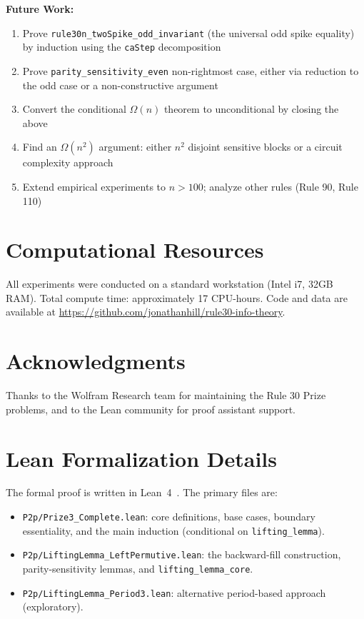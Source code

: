 \documentclass[11pt]{article}
\begin{document}
\textbf{Future Work:}
\begin{enumerate}
    \item Prove \texttt{rule30n\_twoSpike\_odd\_invariant} (the universal odd spike equality) by induction using the \texttt{caStep} decomposition
    \item Prove \texttt{parity\_sensitivity\_even} non-rightmost case, either via reduction to the odd case or a non-constructive argument
    \item Convert the conditional $\Omega(n)$ theorem to unconditional by closing the above
    \item Find an $\Omega(n^2)$ argument: either $n^2$ disjoint sensitive blocks or a circuit complexity approach
    \item Extend empirical experiments to $n > 100$; analyze other rules (Rule 90, Rule 110)
\end{enumerate}

\section*{Computational Resources}

All experiments were conducted on a standard workstation (Intel i7, 32GB RAM). Total compute time: approximately 17 CPU-hours. Code and data are available at \url{https://github.com/jonathanhill/rule30-info-theory}.

\section*{Acknowledgments}

Thanks to the Wolfram Research team for maintaining the Rule 30 Prize problems, and to the Lean community for proof assistant support.




\appendix

\section{Lean Formalization Details}

The formal proof is written in Lean~4~\citep{moura_2021}. The primary files are:
\begin{itemize}
    \item \texttt{P2p/Prize3\_Complete.lean}: core definitions, base cases, boundary essentiality, and the main induction (conditional on \texttt{lifting\_lemma}).
    \item \texttt{P2p/LiftingLemma\_LeftPermutive.lean}: the backward-fill construction, parity-sensitivity lemmas, and \texttt{lifting\_lemma\_core}.
    \item \texttt{P2p/LiftingLemma\_Period3.lean}: alternative period-based approach (exploratory).
\end{itemize}
\end{document}
